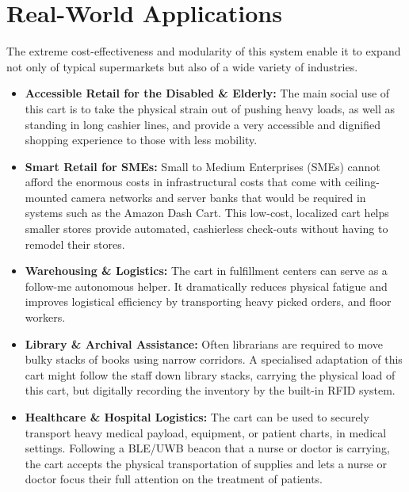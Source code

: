 \documentclass[12pt,a4paper]{article}
\begin{document}
\section{Real-World Applications}
The extreme cost-effectiveness and modularity of this system enable it to expand not only of typical supermarkets but also of a wide variety of industries.

\begin{itemize}
    \item \textbf{Accessible Retail for the Disabled \& Elderly:} The main social use of this cart is to take the physical strain out of pushing heavy loads, as well as standing in long cashier lines, and provide a very accessible and dignified shopping experience to those with less mobility.

    \item \textbf{Smart Retail for SMEs:} Small to Medium Enterprises (SMEs) cannot afford the enormous costs in infrastructural costs that come with ceiling-mounted camera networks and server banks that would be required in systems such as the Amazon Dash Cart. This low-cost, localized cart helps smaller stores provide automated, cashierless check-outs without having to remodel their stores.

    \item \textbf{Warehousing \& Logistics:} The cart in fulfillment centers can serve as a follow-me autonomous helper. It dramatically reduces physical fatigue and improves logistical efficiency by transporting heavy picked orders, and floor workers.

    \item \textbf{Library \& Archival Assistance:} Often librarians are required to move bulky stacks of books using narrow corridors. A specialised adaptation of this cart might follow the staff down library stacks, carrying the physical load of this cart, but digitally recording the inventory by the built-in RFID system.

    \item \textbf{Healthcare \& Hospital Logistics:} The cart can be used to securely transport heavy medical payload, equipment, or patient charts, in medical settings. Following a BLE/UWB beacon that a nurse or doctor is carrying, the cart accepts the physical transportation of supplies and lets a nurse or doctor focus their full attention on the treatment of patients.

\end{itemize}

\newpage
\end{document}
